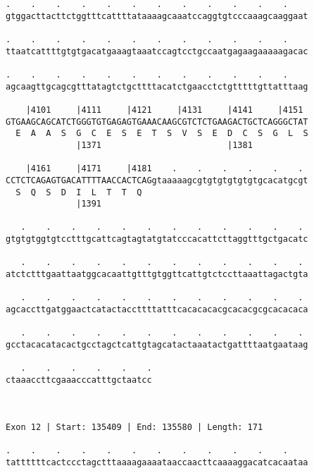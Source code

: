 \documentclass{article}
\begin{document}
\begin{Verbatim}
.    .    .    .    .    .    .    .    .    .    .    .    
gtggacttacttctggtttcattttataaaagcaaatccaggtgtcccaaagcaaggaat
                                                            
.    .    .    .    .    .    .    .    .    .    .    .    
ttaatcattttgtgtgacatgaaagtaaatccagtcctgccaatgagaagaaaaagacac
                                                            
.    .    .    .    .    .    .    .    .    .    .    .    
agcaagttgcagcgtttatagtctgcttttacatctgaacctctgtttttgttatttaag
                                                            
    |4101     |4111     |4121     |4131     |4141     |4151 
GTGAAGCAGCATCTGGGTGTGAGAGTGAAACAAGCGTCTCTGAAGACTGCTCAGGGCTAT
  E  A  A  S  G  C  E  S  E  T  S  V  S  E  D  C  S  G  L  S
              |1371                         |1381           
  
    |4161     |4171     |4181    .    .    .    .    .    . 
CCTCTCAGAGTGACATTTTAACCACTCAGgtaaaaagcgtgtgtgtgtgtgcacatgcgt
  S  Q  S  D  I  L  T  T  Q                                 
              |1391                                         
  
   .    .    .    .    .    .    .    .    .    .    .    . 
gtgtgtggtgtcctttgcattcagtagtatgtatcccacattcttaggtttgctgacatc
                                                            
   .    .    .    .    .    .    .    .    .    .    .    . 
atctctttgaattaatggcacaattgtttgtggttcattgtctccttaaattagactgta
                                                            
   .    .    .    .    .    .    .    .    .    .    .    . 
agcaccttgatggaactcatactaccttttatttcacacacacgcacacgcgcacacaca
                                                            
   .    .    .    .    .    .    .    .    .    .    .    . 
gcctacacatacactgcctagctcattgtagcatactaaatactgattttaatgaataag
                                                            
   .    .    .    .    .    .
ctaaaccttcgaaacccatttgctaatcc
                             
                             
 
Exon 12 | Start: 135409 | End: 135580 | Length: 171
 
.    .    .    .    .    .    .    .    .    .    .    .    
tattttttcactccctagctttaaaagaaaataaccaacttcaaaaggacatcacaataa
                                                            

\end{Verbatim}
\end{document}
